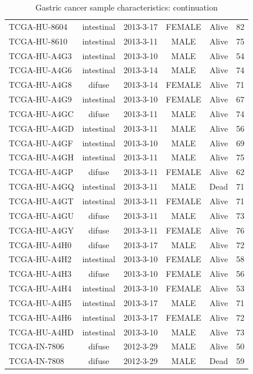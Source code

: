 \documentclass[11pt]{amsart}
\theoremstyle{definition}
\begin{document}
\begin{table}
\begin{center}
\begin{tabular}{lccccc}
TCGA-HU-8604 & intestinal & 2013-3-17 & FEMALE & Alive & 82 \\
TCGA-HU-8610 & intestinal & 2013-3-11 & MALE & Alive & 75 \\
TCGA-HU-A4G3 & intestinal & 2013-3-10 & MALE & Alive & 54 \\
TCGA-HU-A4G6 & intestinal & 2013-3-14 & MALE & Alive & 74 \\
TCGA-HU-A4G8 & difuse & 2013-3-14 & FEMALE & Alive & 71 \\
TCGA-HU-A4G9 & intestinal & 2013-3-10 & FEMALE & Alive & 67 \\
TCGA-HU-A4GC & difuse & 2013-3-11 & MALE & Alive & 74 \\
TCGA-HU-A4GD & intestinal & 2013-3-11 & MALE & Alive & 56 \\
TCGA-HU-A4GF & intestinal & 2013-3-10 & MALE & Alive & 69 \\
TCGA-HU-A4GH & intestinal & 2013-3-11 & MALE & Alive & 75 \\
TCGA-HU-A4GP & difuse & 2013-3-11 & FEMALE & Alive & 62 \\
TCGA-HU-A4GQ & intestinal & 2013-3-11 & MALE & Dead & 71 \\
TCGA-HU-A4GT & intestinal & 2013-3-11 & FEMALE & Alive & 71 \\
TCGA-HU-A4GU & difuse & 2013-3-11 & MALE & Alive & 73 \\
TCGA-HU-A4GY & difuse & 2013-3-11 & FEMALE & Alive & 76 \\
TCGA-HU-A4H0 & difuse & 2013-3-17 & MALE & Alive & 72 \\
TCGA-HU-A4H2 & intestinal & 2013-3-10 & FEMALE & Alive & 58 \\
TCGA-HU-A4H3 & difuse & 2013-3-10 & FEMALE & Alive & 56 \\
TCGA-HU-A4H4 & intestinal & 2013-3-10 & FEMALE & Alive & 53 \\
TCGA-HU-A4H5 & intestinal & 2013-3-17 & MALE & Alive & 71 \\
TCGA-HU-A4H6 & intestinal & 2013-3-17 & FEMALE & Alive & 72 \\
TCGA-HU-A4HD & intestinal & 2013-3-10 & MALE & Alive & 73 \\
TCGA-IN-7806 & difuse & 2012-3-29 & MALE & Alive & 50 \\
TCGA-IN-7808 & difuse & 2012-3-29 & MALE & Dead & 59 \\[1em]
\end{tabular}
\caption{Gastric cancer sample characteristics: continuation}
\label{tbl:gastric_PartC}
\end{center}
\end{table}
\end{document}

